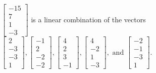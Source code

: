 \begin{exercise}
\begin{exerciseStatement}
  \end{exerciseStatement}
  \begin{exerciseAnswer}
   \(\left[\begin{array}{c}
-15 \\
7 \\
1 \\
-3
\end{array}\right]\) 
  	 is  
	a linear combination of the vectors \(\left[\begin{array}{c}
2 \\
-3 \\
-3 \\
1
\end{array}\right] , \left[\begin{array}{c}
-1 \\
2 \\
-2 \\
-2
\end{array}\right] , \left[\begin{array}{c}
4 \\
2 \\
3 \\
-1
\end{array}\right] , \left[\begin{array}{c}
4 \\
-2 \\
1 \\
-3
\end{array}\right] , \text{ and } \left[\begin{array}{c}
-2 \\
-1 \\
-3 \\
1
\end{array}\right]\).

	
  


  \end{exerciseAnswer}
\end{exercise}